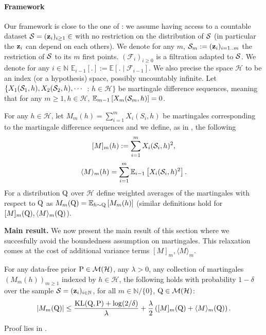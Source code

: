 \paragraph{Framework}

Our framework is close to the one of \cite{seldin2012bandit}: we assume having access to a countable dataset $\S= (\z_i)_{i\geq 1} \in$ with no restriction on the distribution of $\S$ (in particular the $\z_i$ can depend on each others). We denote for any $m$, $\Sm:= (\z_i)_{i=1..m}$ the restriction of $\S$ to its $m$ first points.
$(\mathcal{F}_i)_{i\geq 0}$ is a filtration adapted to $\S$.  We denote for any $i\in\mathbb{N}$ $\mathbb{E}_{i-1} [.] := \mathbb{E} [. \mid \mathcal{F}_{i-1}]$.
We also precise the space $\mathcal{H}$ to be an index (or a hypothesis) space, possibly uncountably infinite.
Let $\left\{X_1(\S_1,h), X_2(\S_2,h), \cdots\right.$ : $h \in \mathcal{H}\}$ be martingale difference sequences, meaning that for any $m\geq 1,h\in\mathcal{H}$, $\mathbb{E}_{m-1}\left[X_m(\Sm,h) \right]=0$.

For any $h\in\mathcal{H}$, let $M_m(h)=\sum_{i=1}^m X_i(S_i,h)$ be martingales corresponding to the martingale difference sequences and we define, as in \citet{bercu2008exponential}, the following
$$[M]_{m}(h):=\sum_{i=1}^m X_i(\S_i,h)^2,$$
$$\langle M\rangle_{m}(h)=\sum_{i=1}^m\mathbb{E}_{i-1}\left[X_{i}(\S_i,h)^{2}\right].$$
For a distribution $\Q$ over $\mathcal{H}$ define weighted averages of the martingales with respect to $\Q$ as $M_m(\Q)= \mathbb{E}_{h\sim \Q}\left[M_m(h)\right]$ (similar definitions hold for $[M]_m(\Q),\langle M\rangle_m (\Q)$).

\textbf{Main result.} We now present the main result of this section where we succesfully avoid the boundedness assumption on martingales. This relaxation comes at the cost of additional variance terms $[M]_m,\langle M \rangle_m$.

\begin{theorem}
\label{th: main_thm}
For any data-free prior $\P\in \mathcal{M}(\mathcal{H})$, any $\lambda>0$, any collection of martingales $(M_m(h))_{m\geq 1}$ indexed by $h\in\mathcal{H}$, the following holds with probability $1-\delta$ over the sample $\S=(\z_i)_{i\in\mathbb{N}}$, for all $m\in\mathbb{N}/\{0\}$, $\Q\in\mathcal{M}(\mathcal{H})$:
\[|M_m(\Q)| \leq   \frac{\operatorname{KL}(\Q,\P) +\log(2/\delta)}{\lambda } + \frac{\lambda}{2}\left([M]_m(\Q) + \langle M\rangle_m(\Q) \right).  \]
\end{theorem}
Proof lies in .

